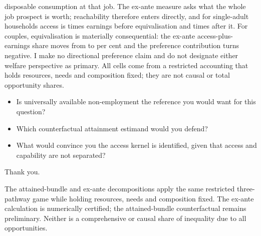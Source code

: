 \documentclass[10pt,aspectratio=169]{beamer}
\renewcommand{\caveat}[1]{{\fontsize{8.2}{10}\selectfont\raggedright\color{deepred}#1\par}}
\begin{document}
\begin{frame}
{disposable consumption at that job. The ex-ante measure asks what the whole job
prospect is worth; reachability therefore enters directly, and for single-adult
households access is \EAAccessRatioSinglesRawRNine{} times earnings before
equivalisation and \EAAccessRatioSinglesEqRNine{} times after it. For couples,
equivalisation is materially consequential: the ex-ante access-plus-earnings
share moves from \EAOppCouplesRawRNine{} to \EAOppCouplesEqRNine{} per cent and
the preference contribution turns negative. I make no directional preference
claim and do not designate either welfare perspective as primary. All cells
come from a restricted accounting that holds resources, needs and composition
fixed; they are not causal or total opportunity shares.}
\end{frame}

\begin{frame}
\vfill
\begin{itemize}\itemsep0.7em
  \item Is universally available non-employment the reference you would want
        for this question?
  \item Which counterfactual attainment estimand would you defend?
  \item What would convince you the access kernel is identified, given that
        access and capability are not separated?
\end{itemize}
\vfill
\caveat{Thank you.}
\end{frame}

\appendix

\begin{frame}
\vfill
{\small The attained-bundle and ex-ante decompositions apply the same restricted three-pathway game while holding resources, needs and composition fixed. The ex-ante calculation is numerically certified; the attained-bundle counterfactual remains preliminary. Neither is a comprehensive or causal share of inequality due to all opportunities.\par}
\vfill
{}
\end{frame}
\end{document}
